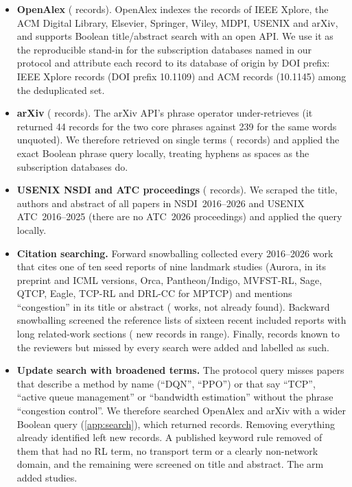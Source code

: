 \begin{itemize}
  \item \textbf{OpenAlex} (\nOpenAlex{} records). OpenAlex indexes the records of IEEE Xplore, the ACM Digital Library, Elsevier, Springer, Wiley, MDPI, USENIX and arXiv, and supports Boolean title/abstract search with an open API. We use it as the reproducible stand-in for the subscription databases named in our protocol and attribute each record to its database of origin by DOI prefix: \nOriginIEEE{} IEEE Xplore records (DOI prefix 10.1109) and \nOriginACM{} ACM records (10.1145) among the deduplicated set.
  \item \textbf{arXiv} (\nArxivMatched{} records). The arXiv API's phrase operator under-retrieves (it returned 44 records for the two core phrases against 239 for the same words unquoted). We therefore retrieved on single terms (\nArxivRetrieved{} records) and applied the exact Boolean phrase query locally, treating hyphens as spaces as the subscription databases do.
  \item \textbf{USENIX NSDI and ATC proceedings} (\nUsenixMatched{} records). We scraped the title, authors and abstract of all \nUsenixScanned{} papers in NSDI~2016--2026 and USENIX ATC~2016--2025 (there are no ATC~2026 proceedings) and applied the query locally.
  \item \textbf{Citation searching.} Forward snowballing collected every 2016--2026 work that cites one of ten seed reports of nine landmark studies (Aurora, in its preprint and ICML versions, Orca, Pantheon/Indigo, MVFST-RL, Sage, QTCP, Eagle, TCP-RL and DRL-CC for MPTCP) and mentions ``congestion'' in its title or abstract (\nForwardRetrieved{} works, \nForwardNew{} not already found). Backward snowballing screened the reference lists of sixteen recent included reports with long related-work sections (\nBackwardNew{} new records in range). Finally, \nReviewerKnown{} records known to the reviewers but missed by every search were added and labelled as such.
  \item \textbf{Update search with broadened terms.} The protocol query misses papers that describe a method by name (``DQN'', ``PPO'') or that say ``TCP'', ``active queue management'' or ``bandwidth estimation'' without the phrase ``congestion control''. We therefore searched OpenAlex and arXiv with a wider Boolean query (\cref{app:search}), which returned \nUpdateRetrieved{} records. Removing everything already identified left \nUpdateNew{} new records. A published keyword rule removed \nUpdateAuto{} of them that had no RL term, no transport term or a clearly non-network domain, and the remaining \nUpdateCandidates{} were screened on title and abstract. The arm added \nUpdateStudies{} studies.
\end{itemize}

